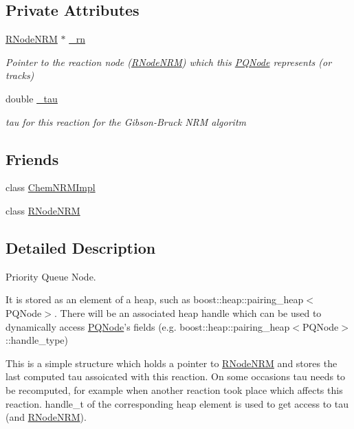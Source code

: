 \subsection*{Private Attributes}
\begin{DoxyCompactItemize}
\item 
\hyperlink{classRNodeNRM}{R\+Node\+N\+R\+M} $\ast$ \hyperlink{classPQNode_a3405abd2d51a7cdde311fda2185fc50e}{\+\_\+rn}
\begin{DoxyCompactList}\small\item\em Pointer to the reaction node (\hyperlink{classRNodeNRM}{R\+Node\+N\+R\+M}) which this \hyperlink{classPQNode}{P\+Q\+Node} represents (or tracks) \end{DoxyCompactList}\item 
double \hyperlink{classPQNode_a1cf2f8482af1add65c9b6c35bfa0857f}{\+\_\+tau}
\begin{DoxyCompactList}\small\item\em tau for this reaction for the Gibson-\/\+Bruck N\+R\+M algoritm \end{DoxyCompactList}\end{DoxyCompactItemize}
\subsection*{Friends}
\begin{DoxyCompactItemize}
\item 
class \hyperlink{classPQNode_a6dae39f8dddcdbda9b4f6a1c1bf1bda8}{Chem\+N\+R\+M\+Impl}
\item 
class \hyperlink{classPQNode_a9dfcd0d41325e8ca108cba1768ebab89}{R\+Node\+N\+R\+M}
\end{DoxyCompactItemize}


\subsection{Detailed Description}
Priority Queue Node. 

It is stored as an element of a heap, such as boost\+::heap\+::pairing\+\_\+heap$<$\+P\+Q\+Node$>$. There will be an associated heap handle which can be used to dynamically access \hyperlink{classPQNode}{P\+Q\+Node}'s fields (e.\+g. boost\+::heap\+::pairing\+\_\+heap$<$\+P\+Q\+Node$>$\+::handle\+\_\+type)

This is a simple structure which holds a pointer to \hyperlink{classRNodeNRM}{R\+Node\+N\+R\+M} and stores the last computed tau assoicated with this reaction. On some occasions tau needs to be recomputed, for example when another reaction took place which affects this reaction. handle\+\_\+t of the corresponding heap element is used to get access to tau (and \hyperlink{classRNodeNRM}{R\+Node\+N\+R\+M}). 

